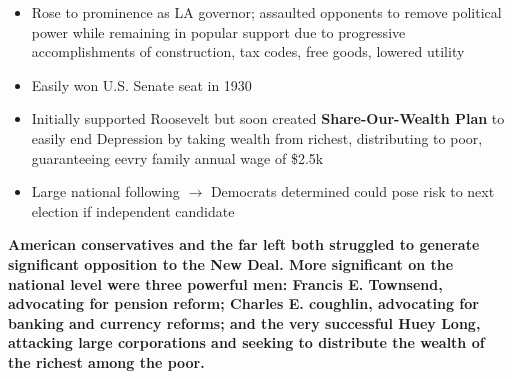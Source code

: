 \documentclass[a4paper]{article}
\begin{document}
{\begin{itemize}
\begin{itemize}
                \begin{itemize}
                    \item Rose to prominence as LA governor; assaulted opponents to remove political power while remaining in popular support due to progressive accomplishments of construction, tax codes, free goods, lowered utility
                    \item Easily won U.S. Senate seat in 1930
                    \item Initially supported Roosevelt but soon created \textbf{Share-Our-Wealth Plan} to easily end Depression by taking wealth from richest, distributing to poor, guaranteeing eevry family annual wage of \$2.5k 
                    \item Large national following $\to$ Democrats determined could pose risk to next election if independent candidate
                \end{itemize}
            \end{itemize}
        \end{itemize}
        \textbf{American conservatives and the far left both struggled to generate significant opposition to the New Deal. More significant on the national level were three powerful men: Francis E. Townsend, advocating for pension reform; Charles E. coughlin, advocating for banking and currency reforms; and the very successful Huey Long, attacking large corporations and seeking to distribute the wealth of the richest among the poor.}}
\end{document}
